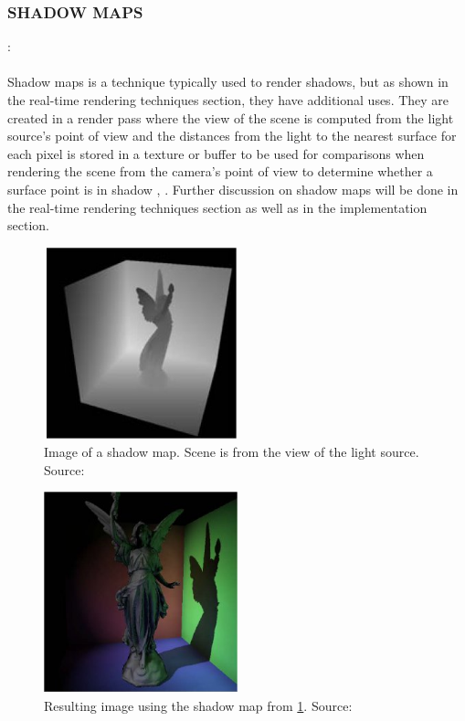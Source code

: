 \subsubsection{SHADOW MAPS}: 
\paragraph{}
Shadow maps is a technique typically used to render shadows, but as shown in the real-time rendering techniques section, they have additional uses.  They are created in a render pass where the view of the scene is computed from the light source's point of view and the distances from the light to the nearest surface for each pixel is stored in a texture or buffer to be used for comparisons when rendering the scene from the camera's point of view to determine whether a surface point is in shadow \cite{Williams1978}, \cite{Reeves1987}.  Further discussion on shadow maps will be done in the real-time rendering techniques section as well as in the implementation section.

\begin{figure}[h!]
  \centering
    \includegraphics[width=0.5\textwidth]{shadowMap1.jpg}
  \caption{Image of a shadow map. Scene is from the view of the light source. Source: \protect\cite{Dachsbacher2005}}
	\label{fig:shadowMap1}
\end{figure}

\begin{figure}[h!]
  \centering
    \includegraphics[width=0.5\textwidth]{shadowMap2.jpg}
  \caption{Resulting image using the shadow map from \ref{fig:shadowMap1}. Source: \protect\cite{Dachsbacher2005}}
	\label{fig:shadowMap2}
\end{figure}

